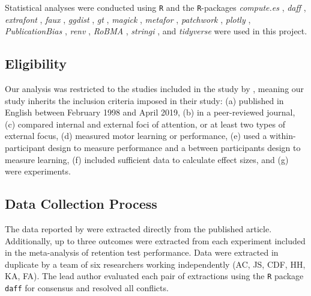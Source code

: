 \documentclass[man,floatsintext,letterpaper,12pt]{apa7}
\begin{document}
Statistical analyses were conducted using
\texttt{R} \autocite[Version 4.3.2;][]{R-base} and the \texttt{R}-packages 
\emph{compute.es} \autocite[Version 0.2.5;][]{R-compute.es},
\emph{daff} \autocite[Version 0.3.5;][]{R-daff},
\emph{extrafont} \autocite[Version 0.19;][]{R-extrafont},
\emph{faux} \autocite[Version 1.2.1;][]{R-faux},
\emph{ggdist} \autocite[Version 3.2.1;][]{R-ggdist},
\emph{gt} \autocite[Version 0.9.0;][]{R-gt},
\emph{magick} \autocite[Version 2.7.4;][]{R-magick},
\emph{metafor} \autocite[Version 4.0.0;][]{R-metafor},
\emph{patchwork} \autocite[Version 1.2.2;][]{R-patchwork},
\emph{plotly} \autocite[Version 4.10.2;][]{R-plotly},
\emph{PublicationBias} \autocite[Version 2.3.0;][]{R-PublicationBias},
\emph{renv} \autocite[Version 0.17.2;][]{R-renv},
\emph{RoBMA} \autocite[Version 2.3.2;][]{R-RoBMA},
\emph{stringi} \autocite[Version 1.7.12;][]{R-stringi},
and \emph{tidyverse} \autocite[Version 2.0.0;][]{R-tidyverse} were used in this project.

\subsection{Eligibility}

Our analysis was restricted to the studies included in the study by \textcite{chua2021}, meaning our study inherits the inclusion criteria imposed in their study: (a) published in English between February 1998 and April 2019, (b) in a peer-reviewed journal, (c) compared internal and external foci of attention, or at least two types of external focus, (d) measured motor learning or performance, (e) used a within-participant design to measure performance and a between participants design to measure learning, (f) included sufficient data to calculate effect sizes, and (g) were experiments.

\subsection{Data Collection Process}

The data reported by \textcite{chua2021} were extracted directly from the published article. Additionally, up to three outcomes were extracted from each experiment included in the meta-analysis of retention test performance.\footnotemark{} Data were extracted in duplicate by a team of six researchers working independently (AC, JS, CDF, HH, KA, FA). The lead author evaluated each pair of extractions using the \texttt{R} package \texttt{daff} \autocite{R-daff} for consensus and resolved all conflicts.
\end{document}
